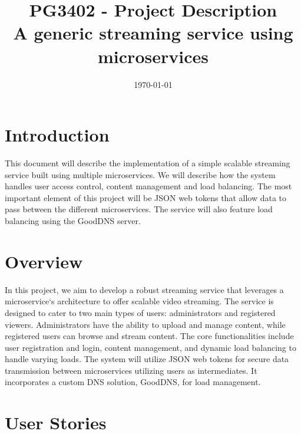 \documentclass[12pt]{article}
\title{\textbf{PG3402 - Project Description} \\ A generic streaming service using microservices}
\date{\today}
\begin{document}
\subsectionfont{\fontsize{12}{14}\selectfont}

\maketitle

\pagebreak

\tableofcontents

\section{Introduction}
This document will describe the implementation of a 
simple scalable streaming service built using multiple microservices\cite{Microservices2024}.
We will describe how the system handles user access control, content management and load balancing.
The most important element of this project will be JSON web tokens\cite{jonesJSONWebToken2015} 
that allow data to pass between the different microservices. 
The service will also feature load balancing using the GoodDNS server\cite{heimonenSlenderman00GoodDns2023}.

\section{Overview} 
In this project, we aim to develop a robust streaming service that leverages a microservice`s architecture to offer 
scalable video streaming. The service is designed to cater to two main types of users: 
administrators and registered viewers. Administrators have the ability to upload and manage content, 
while registered users can browse and stream content.
The core functionalities include user registration and login, 
content management, and dynamic load balancing to handle varying loads. 
The system will utilize JSON web tokens for secure data transmission between 
microservices utilizing users as intermediates. 
It incorporates a custom DNS solution, 
GoodDNS\cite{heimonenSlenderman00GoodDns2023}, for load management.



\section{User Stories}
\end{document}
